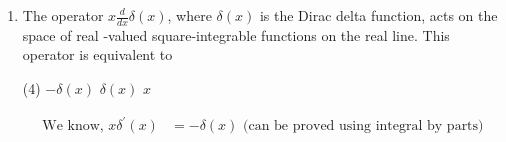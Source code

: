 \begin{enumerate}
 \begin{tasks}(4)
	\task[\textbf{a.}]$\left(\begin{array}{ll}2 & 0 \\ 0 & 2\end{array}\right)$
	\task[\textbf{b.}]$\left(\begin{array}{ll}3 & 0 \\ 0 & 1\end{array}\right)$
	\task[\textbf{c.}]$\left(\begin{array}{ll}3 & 1 \\ 0 & 1\end{array}\right)$
	\task[\textbf{d.}] $\left(\begin{array}{ll}3 & 0 \\ 1 & 1\end{array}\right)$
\end{tasks}
\begin{answer}
	\begin{align*}
	\intertext{ The given vector $\frac{1}{\sqrt{2}}\left(\begin{array}{l}1 \\ 1\end{array}\right)$ and $\frac{1}{\sqrt{2}}\left(\begin{array}{c}1 \\ -1\end{array}\right)$ are eigen vectors of operator $A$.
		Hence in this basis matrix $A$ is represented by diagonal matrix $D$ consisting of eigenvalues of matrix $A$ on the main diagonal. Therefore,}\\
	D&=\left[\begin{array}{ll}
	3 & 0 \\
	0 & 1
	\end{array}\right]
	\end{align*}
		So the correct answer is \textbf{Option (b)}
\end{answer}
\item The operator $x \frac{d}{d x} \delta(x)$, where $\delta(x)$ is the Dirac delta function, acts on the space of real -valued square-integrable functions on the real line. This operator is equivalent to
 \begin{tasks}(4)
	\task[\textbf{a.}]$-\delta(x)$
	\task[\textbf{b.}]$\delta(x)$
	\task[\textbf{c.}]$x$
\end{tasks}
\begin{answer}
	\begin{align*}
	\text { We know, } x \delta^{\prime}(x)&=-\delta(x) \text { (can be proved using integral by parts) }\\

\end{align*}
\end{answer}
\end{enumerate}
